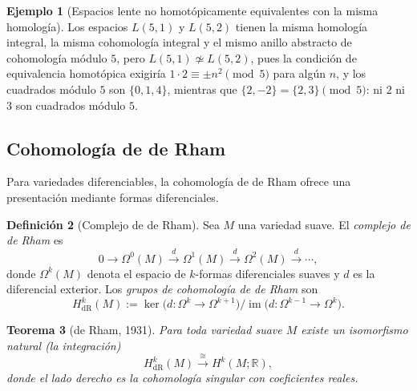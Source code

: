 \documentclass[11pt,a4paper]{article}
\theoremstyle{plain}
\newtheorem{theorem}{Teorema}[section]
\theoremstyle{definition}
\newtheorem{definition}[theorem]{Definición}
\newtheorem{example}[theorem]{Ejemplo}
\theoremstyle{remark}
\newcommand{\RR}{\mathbb R}
\DeclareMathOperator{\im}{im}
\begin{document}
\begin{example}[Espacios lente no homotópicamente equivalentes con la misma homología]
\label{ex:L51-L52}
Los espacios $L(5,1)$ y $L(5,2)$ tienen la misma homología integral, la
misma cohomología integral y el mismo anillo abstracto de cohomología
módulo $5$, pero $L(5,1)\not\simeq L(5,2)$, pues la condición de
equivalencia homotópica exigiría $1\cdot2\equiv\pm n^2\pmod5$ para algún
$n$, y los cuadrados módulo $5$ son $\{0,1,4\}$, mientras que
$\{2,-2\}=\{2,3\}\pmod5$: ni $2$ ni $3$ son cuadrados módulo $5$.
\end{example}

\subsection{Cohomología de de Rham}

Para variedades diferenciables, la cohomología de de Rham ofrece una
presentación mediante formas diferenciales.

\begin{definition}[Complejo de de Rham]
\label{def:complejo-derham}
Sea $M$ una variedad suave. El \emph{complejo de de Rham} es
\[
0\to\Omega^0(M)\xrightarrow{d}\Omega^1(M)\xrightarrow{d}\Omega^2(M)\xrightarrow{d}\cdots,
\]
donde $\Omega^k(M)$ denota el espacio de $k$-formas diferenciales suaves y
$d$ es la diferencial exterior. Los \emph{grupos de cohomología de de
Rham} son
\[
H^k_{\mathrm{dR}}(M):=\ker\big(d:\Omega^k\to\Omega^{k+1}\big)\Big/\im\big(d:\Omega^{k-1}\to\Omega^k\big).
\]
\end{definition}

\begin{theorem}[de Rham, 1931]
\label{thm:derham}
Para toda variedad suave $M$ existe un isomorfismo natural (la
integración)
\[
H^k_{\mathrm{dR}}(M)\xrightarrow{\cong}H^k(M;\RR),
\]
donde el lado derecho es la cohomología singular con coeficientes reales.
\end{theorem}
\end{document}
